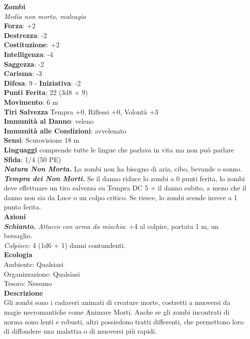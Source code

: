 \begin{multicols}{2}
\medskip\textbf{Zombi}\\
\emph{Media non morto, malvagio}\\
\textbf{Forza}: +2\\
\textbf{Destrezza}: -2\\
\textbf{Costituzione}: +2\\
\textbf{Intelligenza}: -4\\
\textbf{Saggezza}: -2\\
\textbf{Carisma}: -3\\
\textbf{Difesa}: 9 - \textbf{Iniziativa}: -2\\
\textbf{Punti Ferita}: 22 (3d8 + 9)\\
\textbf{Movimento}: 6 m\\
\textbf{Tiri Salvezza}  Tempra +0, Riflessi +0, Volontà +3\\
\textbf{Immunità al Danno}: veleno\\
\textbf{Immunità alle Condizioni}: avvelenato\\
\textbf{Sensi}: Scurovisione 18 m\\
\textbf{Linguaggi} comprende tutte le lingue che parlava in vita ma non può parlare\\
\textbf{Sfida}: 1/4 (50 PE)\smallskip\\
\emph{\textbf{Natura Non Morta.}} Lo zombi non ha bisogno di aria, cibo, bevande o sonno.\\
\emph{\textbf{Tempra dei Non Morti.}} Se il danno riduce lo zombi a 0 punti ferita, lo zombi deve effettuare un tiro salvezza su Tempra DC 5 + il danno subito, a meno che il danno non sia da Luce o un colpo critico. Se riesce, lo zombi scende invece a 1 punto ferita.\\
\smallskip\textbf{Azioni}\\
\emph{\textbf{Schianto.} Attacco con arma da mischia}: +4 al colpire, portata 1 m, un bersaglio.\\
\emph{Colpisce:} 4 (1d6 + 1) danni contundenti.\\
\textbf{Ecologia}\\
Ambiente: Qualsiasi\\
Organizzazione: Qualsiasi\\
Tesoro: Nessuno\\
\textbf{Descrizione}\\
Gli zombi sono i cadaveri animati di creature morte, costretti a muoversi da magie necromantiche come Animare Morti. Anche se gli zombi incontrati di norma sono lenti e robusti, altri possiedono tratti differenti, che permettono loro di diffondere una malattia o di muoversi più rapidi.\\


\end{multicols}
